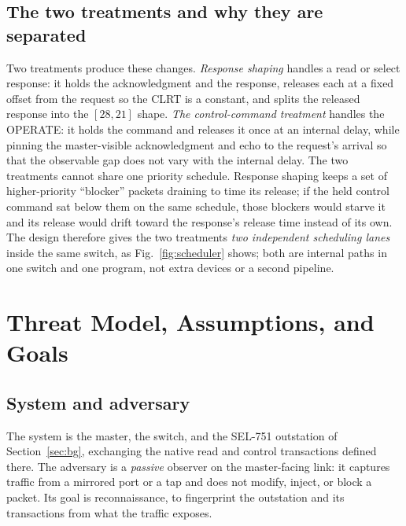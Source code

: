\documentclass[conference]{IEEEtran}
\begin{document}
\subsection{The two treatments and why they are separated}
Two treatments produce these changes. \emph{Response shaping} handles a read or select response: it
holds the acknowledgment and the response, releases each at a fixed offset from the request so the
CLRT is a constant, and splits the released response into the $[28,21]$ shape. \emph{The
control-command treatment} handles the OPERATE: it holds the command and releases it once at an
internal delay, while pinning the master-visible acknowledgment and echo to the request's arrival so
that the observable gap does not vary with the internal delay. The two treatments cannot share one
priority schedule. Response shaping keeps a set of higher-priority ``blocker'' packets draining to
time its release; if the held control command sat below them on the same schedule, those blockers
would starve it and its release would drift toward the response's release time instead of its own.
The design therefore gives the two treatments \emph{two independent scheduling lanes} inside the same
switch, as Fig.~\ref{fig:scheduler} shows; both are internal paths in one switch and one program, not
extra devices or a second pipeline.

\section{Threat Model, Assumptions, and Goals}
\label{sec:threat}

\subsection{System and adversary}
The system is the master, the switch, and the SEL-751 outstation of Section~\ref{sec:bg}, exchanging
the native read and control transactions defined there. The adversary is a \emph{passive} observer on
the master-facing link: it captures traffic from a mirrored port or a tap and does not modify, inject,
or block a packet. Its goal is reconnaissance, to fingerprint the outstation and its transactions from
what the traffic exposes.
\end{document}
